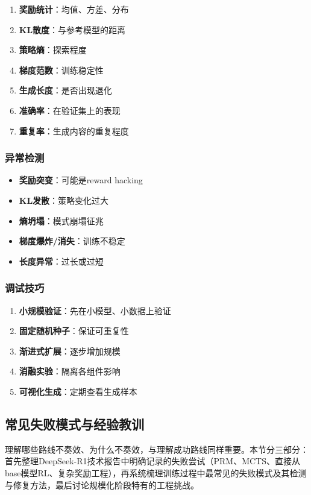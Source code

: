 \documentclass[12pt,a4paper]{article}
\begin{document}
\begin{enumerate}
    \item \textbf{奖励统计}：均值、方差、分布
    \item \textbf{KL散度}：与参考模型的距离
    \item \textbf{策略熵}：探索程度
    \item \textbf{梯度范数}：训练稳定性
    \item \textbf{生成长度}：是否出现退化
    \item \textbf{准确率}：在验证集上的表现
    \item \textbf{重复率}：生成内容的重复程度
\end{enumerate}

\subsubsection{异常检测}

\begin{itemize}
    \item \textbf{奖励突变}：可能是reward hacking
    \item \textbf{KL发散}：策略变化过大
    \item \textbf{熵坍塌}：模式崩塌征兆
    \item \textbf{梯度爆炸/消失}：训练不稳定
    \item \textbf{长度异常}：过长或过短
\end{itemize}

\subsubsection{调试技巧}

\begin{enumerate}
    \item \textbf{小规模验证}：先在小模型、小数据上验证
    \item \textbf{固定随机种子}：保证可重复性
    \item \textbf{渐进式扩展}：逐步增加规模
    \item \textbf{消融实验}：隔离各组件影响
    \item \textbf{可视化生成}：定期查看生成样本
\end{enumerate}

\subsection{常见失败模式与经验教训}

理解哪些路线不奏效、为什么不奏效，与理解成功路线同样重要。本节分三部分：首先整理DeepSeek-R1技术报告中明确记录的失败尝试（PRM、MCTS、直接从base模型RL、复杂奖励工程），再系统梳理训练过程中最常见的失败模式及其检测与修复方法，最后讨论规模化阶段特有的工程挑战。
\end{document}
